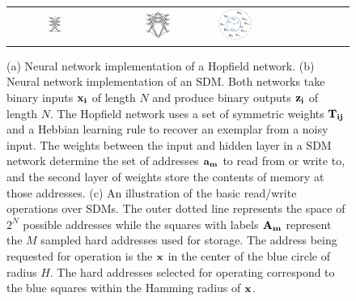 \documentclass[10pt,letterpaper]{article}
\begin{document}
\begin{figure}[t!]
  \begin{center}
    \begin{tabular}{lclclc}
      \raisebox{1.6in}{(a)} &
      \includegraphics[width=0.23\textwidth]{./figures/hopfieldNetwork.png} &
      \raisebox{1.6in}{(b)} &
      \includegraphics[width=0.27\textwidth]{./figures/sdmNetwork.png} 
      \raisebox{1.6in}{(c)} &
      \includegraphics[width=0.29\textwidth]{./figures/sdmOperations.png} &
    \end{tabular}
    \caption{(a) Neural network implementation of a Hopfield
      network. (b) Neural network implementation of an SDM. Both
      networks take binary inputs $\bf{x}_{i}$ of length $N$ and
      produce binary outputs $\bf{z}_{i}$ of length $N$. The Hopfield
      network uses a set of symmetric weights $\bf{T}_{ij}$ and a
      Hebbian learning rule to recover an exemplar from a noisy
      input. The weights between the input and hidden layer in a SDM
      network determine the set of addresses $\bf{a}_{m}$ to read from
      or write to, and the second layer of weights store the contents
      of memory at those addresses. (c) An illustration of the basic
      read/write operations over SDMs. The outer dotted line
      represents the space of $2^{N}$ possible addresses while the
      squares with labels $\bf{A}_{m}$ represent the $M$ sampled hard
      addresses used for storage. The address being requested for
      operation is the $\bf{x}$ in the center of the blue circle of
      radius $H$. The hard addresses selected for operating correspond
      to the blue squares within the Hamming radius of $\bf{x}$.}
\label{neuralNets}
\end{center}
\end{figure}
\end{document}
